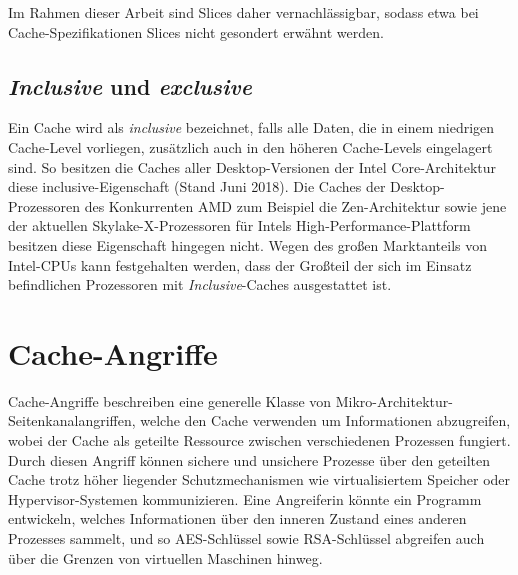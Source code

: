 Im Rahmen dieser Arbeit sind Slices daher vernachlässigbar, sodass etwa bei Cache-Spezifikationen Slices nicht gesondert erwähnt werden.





\subsection{\textit{Inclusive} und \textit{exclusive}}
Ein Cache wird als \textit{inclusive} bezeichnet, falls alle Daten, die in einem niedrigen Cache-Level vorliegen, zusätzlich auch in den höheren Cache-Levels eingelagert sind. 
So besitzen die Caches aller Desktop-Versionen der Intel Core-Architektur diese inclusive-Eigenschaft (Stand Juni 2018).
Die Caches der Desktop-Prozessoren des Konkurrenten AMD zum Beispiel die Zen-Architektur \cite{CacheRyzen} sowie jene der aktuellen Skylake-X-Prozessoren \cite{CacheSkylakeX} für Intels High-Performance-Plattform besitzen diese Eigenschaft hingegen nicht.
Wegen des großen Marktanteils von Intel-CPUs kann festgehalten werden, dass der Großteil der sich im Einsatz befindlichen Prozessoren mit \textit{Inclusive}-Caches ausgestattet ist.

\section{Cache-Angriffe}

Cache-Angriffe beschreiben eine generelle Klasse von Mikro-Architektur-Seitenkanalangriffen, welche den Cache verwenden um Informationen abzugreifen, wobei der Cache als geteilte Ressource zwischen verschiedenen Prozessen fungiert. Durch diesen Angriff können sichere und unsichere Prozesse über den geteilten Cache trotz höher liegender Schutzmechanismen wie virtualisiertem Speicher oder Hypervisor-Systemen kommunizieren. 
Eine Angreiferin könnte ein Programm entwickeln, welches Informationen über den inneren Zustand eines anderen Prozesses sammelt, und so AES-Schlüssel \cite{BernsteinAES} sowie RSA-Schlüssel \cite{CacheAttackRSA} abgreifen auch über die Grenzen von virtuellen Maschinen hinweg.

